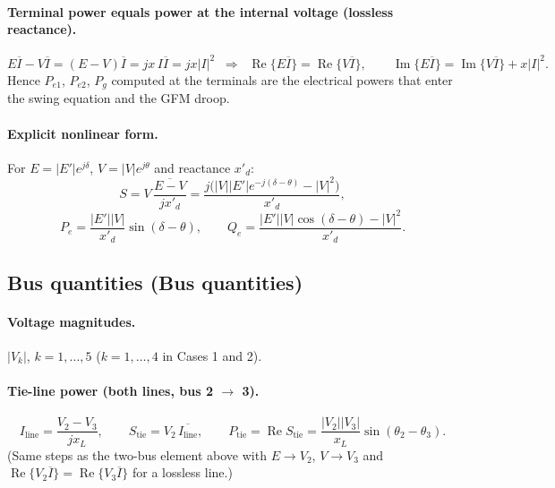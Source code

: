 \documentclass[11pt,a4paper]{article}
\numberwithin{equation}{section}
\newcommand{\cj}[1]{\overline{#1}}
\newcommand{\re}{\operatorname{Re}}
\newcommand{\im}{\operatorname{Im}}
\newcommand{\blk}[1]{\textsf{#1}}
\begin{document}
\paragraph{Terminal power equals power at the internal voltage (lossless reactance).}
\begin{equation}
E\cj I - V\cj I = (E-V)\cj I = jx\,I\cj I = jx|I|^2
\;\;\Longrightarrow\;\;
\re\{E\cj I\} = \re\{V\cj I\},\qquad \im\{E\cj I\} = \im\{V\cj I\} + x|I|^2 .
\end{equation}
Hence $P_{e1}$, $P_{e2}$, $P_g$ computed at the terminals are the electrical powers that enter the swing equation and the GFM droop.

\paragraph{Explicit nonlinear form.}
For $E=|E'|e^{j\delta}$, $V=|V|e^{j\theta}$ and reactance $x'_d$:
\begin{equation}
S = V\,\cj{\frac{E-V}{jx'_d}}
= \frac{j\big(|V||E'|e^{-j(\delta-\theta)}-|V|^2\big)}{x'_d},
\end{equation}
\begin{equation}
\boxed{P_e = \frac{|E'||V|}{x'_d}\sin(\delta-\theta),\qquad
Q_e = \frac{|E'||V|\cos(\delta-\theta) - |V|^2}{x'_d}.}
\end{equation}

\subsection{Bus quantities (\blk{Bus quantities})}
\paragraph{Voltage magnitudes.} $|V_k|$, $k=1,\dots,5$ ($k=1,\dots,4$ in Cases 1 and 2).

\paragraph{Tie-line power (both lines, bus 2 $\to$ 3).}
\begin{equation}
I_{\text{line}} = \frac{V_2 - V_3}{jx_L},\qquad
S_{\text{tie}} = V_2\,\cj{I_{\text{line}}},\qquad
\boxed{P_{\text{tie}} = \re S_{\text{tie}} = \frac{|V_2||V_3|}{x_L}\sin(\theta_2-\theta_3).}
\end{equation}
(Same steps as the two-bus element above with $E\to V_2$, $V\to V_3$ and $\re\{V_2\cj I\}=\re\{V_3\cj I\}$ for a lossless line.)
\end{document}
